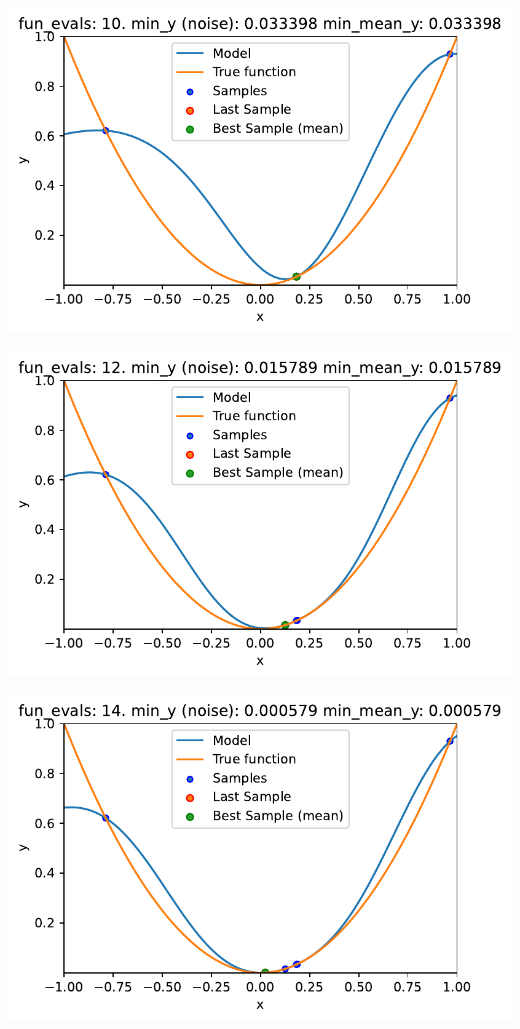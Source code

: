 \documentclass[
  letterpaper,
  DIV=11,
  numbers=noendperiod]{scrreprt}
\begin{document}
\includegraphics{013_num_spot_noisy_files/figure-pdf/cell-10-output-4.pdf}

\includegraphics{013_num_spot_noisy_files/figure-pdf/cell-10-output-5.pdf}

\includegraphics{013_num_spot_noisy_files/figure-pdf/cell-10-output-6.pdf}
\end{document}
